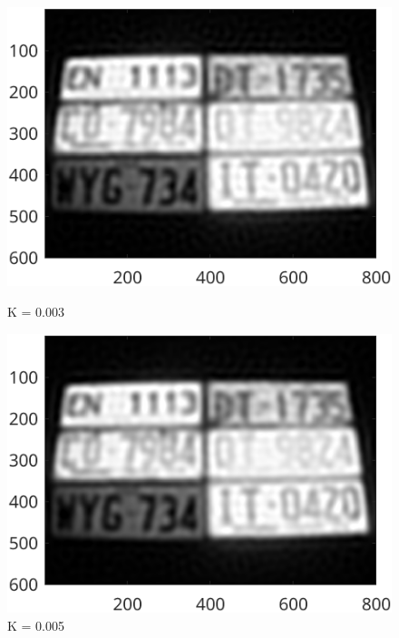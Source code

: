 \documentclass{article}
\begin{document}
	\begin{figure}[ht]
  	\centering
  	\begin{minipage}[t]{0.45\textwidth}
    	\centering
    	\includegraphics[width=\textwidth]{2AE3_D003}
    	\caption{K = 0.003}
    	\label{fig:2AE3_D003}
  	\end{minipage}\hfill
  	\begin{minipage}[t]{0.45\textwidth}
    	\centering
    	\includegraphics[width=\textwidth]{2AE3_D005}
    	\caption{K = 0.005}
    	\label{fig:2AE3_D005}
  	\end{minipage}
	\end{figure}




	\par\vspace{10pt}
\end{document}

